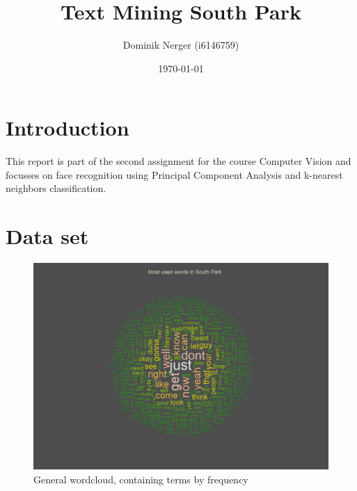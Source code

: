 \documentclass[10pt,a4paper]{article}
\author{Dominik Nerger (i6146759)}
\title{Text Mining South Park}
\date{\today}
\begin{document}
	\maketitle
	
	\tableofcontents
	
	\section{Introduction}
	
	This report is part of the second assignment for the course Computer Vision and focusses on face recognition using Principal Component Analysis and k-nearest neighbors classification.
	
	\section{Data set}
	\begin{figure}[h]
	\centering
	\includegraphics[scale=0.9]{images/WordCloud.png}
	\caption{General wordcloud, containing terms by frequency}
	\label{fig:WordCloud}
	\end{figure}
	
\end{document}
